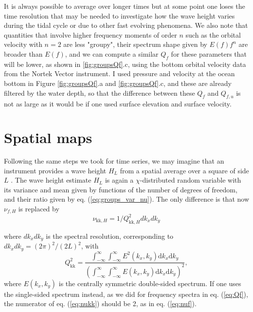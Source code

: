{It is always possible to average over longer times but at some point one loses the time resolution that may be needed to investigate how the wave height varies during the tidal cycle or due to other fast evolving phenomena. We also note that quantities that involve higher frequency moments of order $n$ such as the orbital velocity with $n=2$ are less "groupy", their spectrum shape given by $E(f)f^n$ are broader than $E(f)$,  and we can compute a similar $Q_f$ for these parameters that will be lower, as shown in  \ref{fig:groupsQf}.c, using the bottom orbital velocity data from the Nortek Vector instrument. I used pressure and velocity at the ocean bottom in Figure \ref{fig:groupsQf}.a and \ref{fig:groupsQf}.c, and these are already filtered by the water depth, so that the difference between these  $Q_f$  and  $Q_{f,u}$ is not as large as it would be if one used surface elevation and surface velocity.  


\section{Spatial maps}
Following the same steps we took for time series, we may imagine that an instrument provides a wave height  $H_{L}$ from a spatial average over a 
square of side $L$ \citep{Lenain&al.2023,Ardhuin&al.2024}. The wave height estimate $H_L$ is  again a $\chi$-distributed random variable with its variance and mean given by  functions of the number of 
degrees of freedom, and their ratio given by eq. (\ref{eq:groups_var_nu}). The only difference is that now  $\nu_{f,H}$ is replaced by 
\begin{equation} 
\nu_{\mathrm{kk},H}=1/ Q_{\mathrm{kk},H}^2 dk_x dk_y \label{eq:nukk}
\end{equation}

 where $dk_x dk_y$ is the spectral resolution, corresponding to $dk_x dk_y=(2 \pi)^2/(2 L)^2$, with 
\begin{equation} 
   Q_{\mathrm{kk}}^2 = \frac{  \int_{-\infty}^\infty \int_{-\infty}^\infty E^2(k_x,k_y)\mathrm{d}k_x \mathrm{d}k_y }{\left( \int_{-\infty}^\infty \int_{-\infty}^\infty E(k_x,k_y)\mathrm{d}k_x \mathrm{d}k_y  \right)^2} \label{eq:Qkk},
\end{equation}
where  $E(k_x,k_y)$ is the centrally symmetric double-sided spectrum. If one uses the single-sided spectrum instead, as we did for frequency spectra in eq. (\ref{eq:Qf}), the numerator of eq. (\ref{eq:nukk}) should be 2, as in  eq. (\ref{eq:nuf}). 

}
